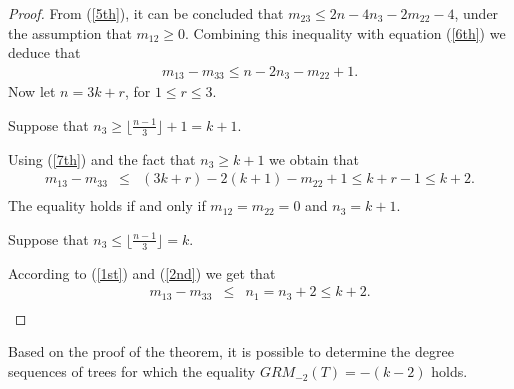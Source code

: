 \documentclass[preprint,12pt]{elsarticle}
\begin{document}
\begin{proof}
From (\ref{5th}),  it can be concluded that 
$m_{23}\leq  2n-4n_3-2m_{22} -4$, under the assumption that $m_{12} \geq 0$.
Combining this inequality with equation (\ref{6th}) we deduce that
\begin{eqnarray}
m_{13}-m_{33}\leq n-2n_3-m_{22}+1.\label{7th}
\end{eqnarray}
Now let $n=3k+r$, for $1\leq r\leq 3$.

\medskip

Suppose that $n_3\geq \lfloor \frac{n-1}{3} \rfloor+1=k+1$.

Using (\ref{7th}) and the fact that $n_3\geq k+1$ we obtain that 
\begin{eqnarray}
\label{inequality2}
m_{13}-m_{33}&\leq& (3k+r)-2(k+1)-m_{22}+1\leq k+r-1\leq k+2.\\\nonumber
\end{eqnarray}
The equality holds if and only if $m_{12}=m_{22}=0$ and $n_3=k+1$.

\medskip

Suppose that $n_3\leq \lfloor \frac{n-1}{3} \rfloor=k$.

According to (\ref{1st}) and (\ref{2nd}) we get that
\begin{eqnarray}
\label{inequality1}
    m_{13}-m_{33}&\leq & n_1=n_3+2\leq k+2.\\\nonumber
\end{eqnarray}


\end{proof}

Based on the proof of the theorem, it is possible to determine the degree sequences of trees for which the equality $GRM_{-2}(T) = -(k-2)$ holds.
\end{document}
